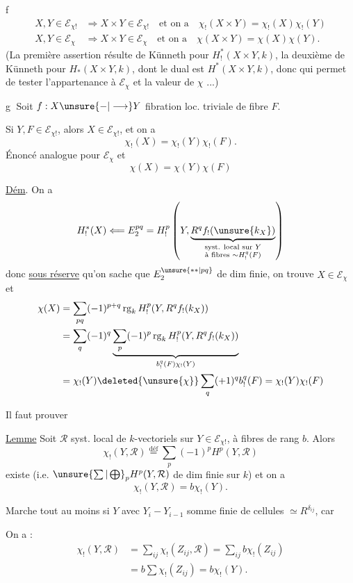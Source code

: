 
\textcircled{f}
\[
\begin{aligned}
X,Y\in\mathcal{E}_{\chi!}&\Longrightarrow X\times Y\in\mathcal{E}_{\chi!}\quad\text{et on a}\quad\chi_!(X\times Y)=\chi_!(X)\chi_!(Y)\\
X,Y\in\mathcal{E}_{\chi}&\Longrightarrow X\times Y\in\mathcal{E}_{\chi}\quad\text{et on a}\quad\chi(X\times Y)=\chi(X)\chi(Y).
\end{aligned}
\]
(La première assertion résulte de Künneth pour $H^*_!(X\times Y,k)$, la deuxième de Künneth pour $H_*(X\times Y,k)$, dont le dual est $H^*(X\times Y,k)$, donc qui permet de tester l'appartenance à $\mathcal{E}_{\chi}$ et la valeur de $\chi$ ...)

\textcircled{g} Soit $f:X\unsure{-|\longrightarrow}Y$ fibration loc. triviale de fibre $F$.

Si $Y,F\in\mathcal{E}_{\chi!}$, alors $X\in\mathcal{E}_{\chi!}$, et on a
\[
\chi_!(X)=\chi_!(Y)\chi_!(F).
\]
Énoncé analogue pour $\mathcal{E}_{\chi}$ et 
\[
\chi(X)=\chi(Y)\chi(F)
\]

\uline{Dém}. On a
\[
H^*_!(X)\Longleftarrow E_2^{pq}=H^p_!\left(Y,\underbrace{R^q f_!(\unsure{k_X})}_{\substack{\text{syst. local sur }Y\\\text{à fibres }\sim H^q_!(F)}}\right)
\]
donc \uline{sous réserve} qu'on sache que $E_2^{\unsure{**|pq}}$ de dim finie, on trouve $X\in\mathcal{E}_{\chi}$ et
\[
\begin{aligned}
\chi(X)&=\sum_{pq}(-1)^{p+q}\operatorname{rg}_k H^p_!(Y,R^q f_!(k_X))\\
&=\sum_q(-1)^q\underbrace{\sum_p(-1)^p\operatorname{rg}_k H^p_!(Y,R^q f_!(k_X))}_{b^q_!(F)\chi_!(Y)}\\
&=\chi_!(Y)\deleted{\unsure{\chi}}\sum_q(+1)^q b^q_!(F)=\chi_!(Y)\chi_!(F)
\end{aligned}
\]

Il faut prouver

\uline{Lemme} Soit $\mathcal{R}$ syst. local de $k$-vectoriels sur  $Y\in\mathcal{E}_{\chi!}$, à fibres de rang  $b$. Alors
\[
\chi_!(Y,\mathcal{R})\overset{\mathrm{déf}}=\sum_p(-1)^p H^p(Y,\mathcal{R})
\]
existe (i.e. $\unsure{\sum|\bigoplus}_p H^p(Y,\mathcal{R})$ de dim finie sur $k$) et on a
\[
\chi_!(Y,\mathcal{R})=b\chi_!(Y).
\]

Marche tout au moins si $Y$   avec $Y_i-Y_{i-1}$ somme finie de cellules $\simeq R^{\delta_{ij}}$, car

On a :
\[
\begin{aligned}
\chi_!(Y,\mathcal{R})&=\sum_{ij}\chi_!(Z_{ij},\mathcal{R})=\sum_{ij}b\chi_!(Z_{ij})\\
&=b\sum\chi_!(Z_{ij})=b\chi_!(Y).
\end{aligned}
\]
\margin{(\unsure{ct.} sur $Z_{ij}$\unsure{)|]}}

